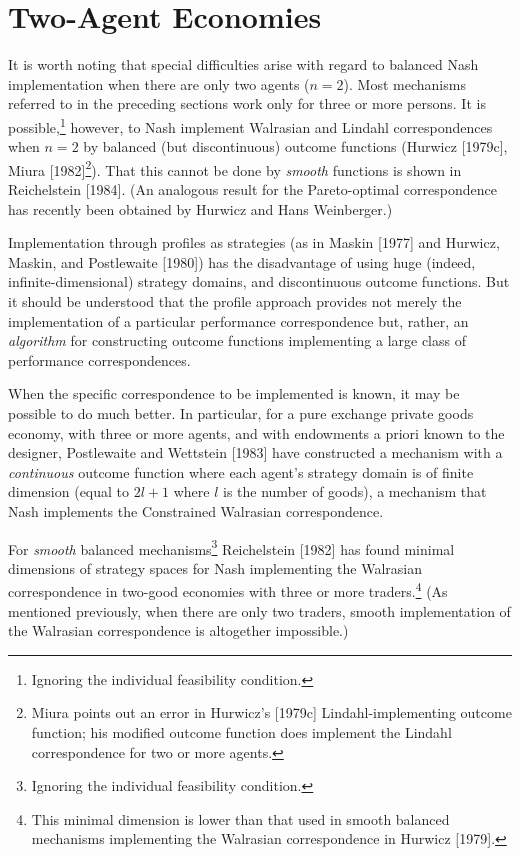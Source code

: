 \documentclass[12pt, letterpaper]{article}
\begin{document}
\section*{Two-Agent Economies}

It is worth noting that special difficulties arise with regard to balanced Nash implementation when there are only two agents ($n = 2$). Most mechanisms referred to in the preceding sections work only for three or more persons. It is possible,\footnote{Ignoring the individual feasibility condition.} however, to Nash implement Walrasian and Lindahl correspondences when $n = 2$ by balanced (but discontinuous) outcome functions (Hurwicz [1979c], Miura [1982]\footnote{Miura points out an error in Hurwicz's [1979c] Lindahl-implementing outcome function; his modified outcome function does implement the Lindahl correspondence for two or more agents.}). That this cannot be done by \textit{smooth} functions is shown in Reichelstein [1984]. (An analogous result for the Pareto-optimal correspondence has recently been obtained by Hurwicz and Hans Weinberger.)

Implementation through profiles as strategies (as in Maskin [1977] and Hurwicz, Maskin, and Postlewaite [1980]) has the disadvantage of using huge (indeed, infinite-dimensional) strategy domains, and discontinuous outcome functions. But it should be understood that the profile approach provides not merely the implementation of a particular performance correspondence but, rather, an \textit{algorithm} for constructing outcome functions implementing a large class of performance correspondences.

When the specific correspondence to be implemented is known, it may be possible to do much better. In particular, for a pure exchange private goods economy, with three or more agents, and with endowments a priori known to the designer, Postlewaite and Wettstein [1983] have constructed a mechanism with a \textit{continuous} outcome function where each agent's strategy domain is of finite dimension (equal to $2l + 1$ where $l$ is the number of goods), a mechanism that Nash implements the Constrained Walrasian correspondence.

For \textit{smooth} balanced mechanisms\footnote{Ignoring the individual feasibility condition.} Reichelstein [1982] has found minimal dimensions of strategy spaces for Nash implementing the Walrasian correspondence in two-good economies with three or more traders.\footnote{This minimal dimension is lower than that used in smooth balanced mechanisms implementing the Walrasian correspondence in Hurwicz [1979].} (As mentioned previously, when there are only two traders, smooth implementation of the Walrasian correspondence is altogether impossible.)
\end{document}
